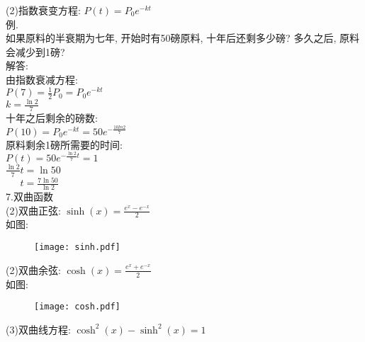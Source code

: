 (2)指数衰变方程: $P(t)=P_0e^{-kt}$\\
例.\\
\phantom{空格}如果原料的半衰期为七年, 开始时有50磅原料, 十年后还剩多少磅? 多久之后, 原料会减少到1磅?\\
解答:\\
由指数衰减方程:\\
\phantom{\qquad}$\displaystyle P(7)=\frac{1}{2}P_0=P_0e^{-kt}$\\
\phantom{\qquad}$\displaystyle k=\frac{\ln2}{7}$\\
十年之后剩余的磅数:\\
$\displaystyle P(10)=P_0e^{-kt}=50e^{-\frac{10ln2}{7}}$\\
原料剩余1磅所需要的时间:\\
$\displaystyle P(t)=50e^{-\frac{\ln2}{7}t}=1$\\
$\displaystyle\frac{\ln2}{7}t=\ln50$\\
$\displaystyle\phantom{\frac{\ln2}{7}}t=\frac{7\ln50}{\ln2}$\\[2ex]

7.双曲函数\\
(2)双曲正弦: $\displaystyle\sinh(x)=\frac{e^x-e^{-x}}{2}$\\[1ex]
如图:
\begin{figure}[H]
\centering
\texttt{[image: sinh.pdf]}
\end{figure}
(2)双曲余弦: $\displaystyle\cosh(x)=\frac{e^x+e^{-x}}{2}$\\[1ex]
如图:
\begin{figure}[H]
\centering
\texttt{[image: cosh.pdf]}
\end{figure}
(3)双曲线方程: $\cosh^2(x)-\sinh^2(x)=1$\\[1ex]


